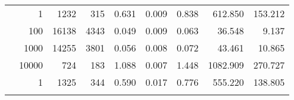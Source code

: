 \begin{table}
\begin{tabular}{rrrrrrrrr}
	            
	        
				\noalign{\smallskip}\hline
				\multirow{ 4 }{*}{ 80000 } &
				
					
					 
					\multirow{ 1 }{*}{ 1 } &
					
						
							    
							     1232  & 315  
	                           & 0.631 & 0.009 & 0.838
	                           & 612.850 & 153.212  \\
	                
	            
					 &  
					 
					\multirow{ 1 }{*}{ 100 } &
					
						
							    
							     16138  & 4343  
	                           & 0.049 & 0.009 & 0.063
	                           & 36.548 & 9.137  \\
	                
	            
					 &  
					 
					\multirow{ 1 }{*}{ 1000 } &
					
						
							    
							     14255  & 3801  
	                           & 0.056 & 0.008 & 0.072
	                           & 43.461 & 10.865  \\
	                
	            
					 &  
					 
					\multirow{ 1 }{*}{ 10000 } &
					
						
							    
							     724  & 183  
	                           & 1.088 & 0.007 & 1.448
	                           & 1082.909 & 270.727  \\
	                
	            
	        
				\noalign{\smallskip}\hline
				\multirow{ 4 }{*}{ 160000 } &
				
					
					 
					\multirow{ 1 }{*}{ 1 } &
					
						
							    
							     1325  & 344  
	                           & 0.590 & 0.017 & 0.776
	                           & 555.220 & 138.805  \\
	                
	            
					 &  
					 

\end{tabular}
\end{table}

